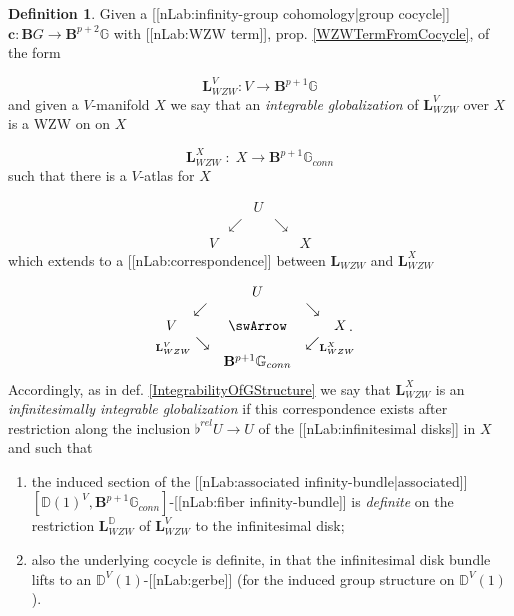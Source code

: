 \documentclass[12pt,titlepage]{article}
\def\mathllap{\mathpalette\mathllapinternal}
\def\mathrlap{\mathpalette\mathrlapinternal}
\def\mathllapinternal#1#2{\llap{$\mathsurround=0pt#1{#2}$}}
\def\mathrlapinternal#1#2{\rlap{$\mathsurround=0pt#1{#2}$}}
\newcommand{\itexarray}[1]{\begin{matrix}#1\end{matrix}}
\theoremstyle{plain}
\theoremstyle{definition}
\newtheorem{defn}{Definition}
\theoremstyle{remark}
\begin{document}
\begin{defn}
\label{DefiniteGlobalizationofWZWTerm}\hypertarget{DefiniteGlobalizationofWZWTerm}{}
Given a [[nLab:infinity-group cohomology|group cocycle]] $\mathbf{c} \colon \mathbf{B}G\to\mathbf{B}^{p+2}\mathbb{G}$ with [[nLab:WZW term]], prop. \ref{WZWTermFromCocycle}, of the form

\begin{displaymath}
\mathbf{L}_{WZW}^V
  \colon
  V \longrightarrow \mathbf{B}^{p+1}\mathbb{G}
\end{displaymath}
and given a $V$-manifold $X$ we say that an \emph{integrable globalization} of $\mathbf{L}_{WZW}^V$ over $X$ is a WZW on on $X$

\begin{displaymath}
\mathbf{L}_{WZW}^X \;\colon\;X \longrightarrow \mathbf{B}^{p+1}\mathbb{G}_{conn}
\end{displaymath}
such that there is a $V$-atlas for $X$

\begin{displaymath}
\itexarray{
     && U
     \\
     & \swarrow && \searrow
     \\
     V && && X
  }
\end{displaymath}
which extends to a [[nLab:correspondence]] between $\mathbf{L}_{WZW}$ and $\mathbf{L}_{WZW}^X$

\begin{displaymath}
\itexarray{
     && U
     \\
     & \swarrow && \searrow
     \\
     V && \swArrow && X
     \\
     & {}_{\mathllap{\mathbf{L}_{WZW}^V}}\searrow && \swarrow_{\mathrlap{\mathbf{L}_{WZW}^X}}
     \\
     && \mathbf{B}^{p+1}\mathbb{G}_{conn}
  }
  \,.
\end{displaymath}
Accordingly, as in def. \ref{IntegrabilityOfGStructure} we say that $\mathbf{L}_{WZW}^X$ is an \emph{infinitesimally integrable globalization} if this correspondence exists after restriction along the inclusion $\flat^{rel} U \to U$ of the [[nLab:infinitesimal disks]] in $X$ and such that

\begin{enumerate}%
\item the induced section of the [[nLab:associated infinity-bundle|associated]] $[\mathbb{D}(1)^V,\mathbf{B}^{p+1}\mathbb{G}_{conn}]$-[[nLab:fiber infinity-bundle]] is \emph{definite} on the restriction $\mathbf{L}_{WZW}^{\mathbb{D}}$ of $\mathbf{L}_{WZW}^V$ to the infinitesimal disk;


\item also the underlying cocycle is definite, in that the infinitesimal disk bundle lifts to an $\mathbb{D}^V(1)$-[[nLab:gerbe]] (for the induced group structure on $\mathbb{D}^V(1)$).



\end{enumerate}
\end{defn}
\end{document}
